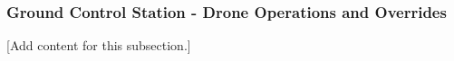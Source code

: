 
\subsubsection{Ground Control Station - Drone Operations and Overrides}
\label{subsubsec:design_12_3_gcs_drone_operations_overrides}

[Add content for this subsection.]
